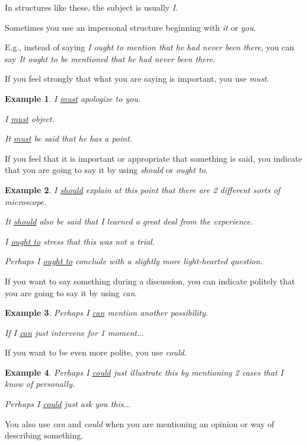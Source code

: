 \documentclass[oneside]{book}
\numberwithin{equation}{section}
\newtheorem{example}{Example}[section]
\begin{document}
%
In structures like these, the subject is usually \textit{I}.

Sometimes you use an impersonal structure beginning with \textit{it} or \textit{you}.

E.g., instead of saying \textit{I ought to mention that he had never been there}, you can say \textit{It ought to be mentioned that he had never been there}.

%
\noindent{} If you feel strongly that what you are saying is important, you use \textit{must}.
\begin{example}
    I \underline{must} apologize to you.
    
    I \underline{must} object.
    
    It \underline{must} be said that he has a point.
\end{example}
%
\noindent{} If you feel that it is important or appropriate that something is said, you indicate that you are going to say it by using \textit{should} or \textit{ought to}.
\begin{example}
    I \underline{should} explain at this point that there are 2 different sorts of microscope.
    
    It \underline{should} also be said that I learned a great deal from the experience.
    
    I \underline{ought to} stress that this was not a trial.
    
    Perhaps I \underline{ought to} conclude with a slightly more light-hearted question.
\end{example}
%
\noindent{} If you want to say something during a discussion, you can indicate politely that you are going to say it by using \textit{can}.
\begin{example}
    Perhaps I \underline{can} mention another possibility.
    
    If I \underline{can} just intervene for 1 moment$\ldots$
\end{example}
If you want to be even more polite, you use \textit{could}.
\begin{example}
    Perhaps I \underline{could} just illustrate this by mentioning 2 cases that I know of personally.
    
    Perhaps I \underline{could} just ask you this$\ldots$
\end{example}
%
\noindent{} You also use \textit{can} and \textit{could} when you are mentioning an opinion or way of describing something.
\end{document}
